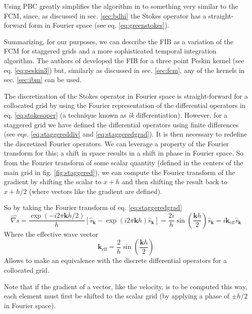 \documentclass[ twoside,openright,titlepage,numbers=noenddot,%
headinclude,footinclude,cleardoublepage=empty,abstract=on,
BCOR=5mm,paper=a4,fontsize=11pt, dvipsnames
]{scrreprt}
\renewcommand{\vec}[1]{\bm{#1}}
\newcommand{\fou}[1]{\widehat{#1}}
\begin{document}
Using \gls{PBC} greatly simplifies the algorithm in \cite{Delong2014} to something very similar to the \gls{FCM}, since, as discussed in sec. \ref{sec:bdhi} the Stokes operator has a straight-forward form in Fourier space (see eq. \eqref{eq:greenstokes}).

Summarizing, for our purposes, we can describe the \gls{FIB} as a variation of the \gls{FCM} for staggered grids and a more sophisticated temporal integration algorithm. The authors of \cite{Delong2013} developed the \gls{FIB} for a three point Peskin kernel (see eq. \eqref{eq:peskin3}) but, similarly as discussed in sec. \ref{sec:fcm}, any of the kernels in sec. \ref{sec:ibm} can be used.

The discretization of the Stokes operator in Fourier space is straight-forward for a collocated grid by using the Fourier representation of the differential operators in eq. \eqref{eq:stokesoper} (a technique known as \emph{ik} differentiation). However, for a staggered grid we have defined the differential operators using finite differences (see eqs. \eqref{eq:staggereddiv} and \eqref{eq:staggeredgrad}). It is then necessary to redefine the discretized Fourier operators. We can leverage a property of the Fourier transform for this; a shift in space results in a shift in phase in Fourier space. So from the Fourier transform of some scalar quantity (defined in the centers of the main grid in fig. \ref{fig:staggered}), we can compute the Fourier transform of the gradient by shifting the scalar to $x+h$ and then shifting the result back to $x+h/2$ (where vectors like the gradient are defined).

So by taking the Fourier transform of eq. \eqref{eq:staggeredgrad}
\begin{equation}
  \label{eq:staggeredgradfou}
  \fou{\nabla s} = \frac{\exp(-i2\pi \vec{k} h/2)}{h}\left[\fou{s}_{\vec{k}} - \exp(i2\pi \vec{k} h)\fou{s}_{\vec{k}}\right] = \frac{2i}{h}\sin\left(\frac{\vec{k} h}{2}\right)\fou{s}_{\vec{k}} = i\vec{k}_{\text{eff}}\fou{s}_{\vec{k}}
\end{equation}
Where the effective wave vector
\begin{equation}
  \vec{k}_{\text{eff}} = \frac{2}{h}\sin\left(\frac{\vec{k}h}{2}\right)
\end{equation}
Allows to make an equivalence with the discrete differential operators for a collocated grid.

Note that if the gradient of a vector, like the velocity, is to be computed this way, each element must first be shifted to the scalar grid (by applying a phase of $\pm h/2$ in Fourier space).
\end{document}
